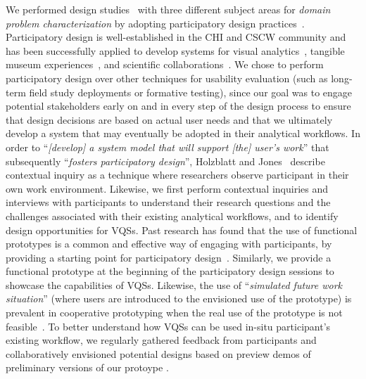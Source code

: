   \par We performed design studies~\cite{lam2012empirical,shneiderman2006strategies,Sedlmair2012} with three different subject areas for \textit{domain problem characterization} by adopting participatory design practices~\cite{Gould1983,Muller1993}. Participatory design is well-established in the CHI and CSCW community and has been successfully applied to develop systems for visual analytics~\cite{Aragon2008,Chuang2012}, tangible museum experiences~\cite{Ciolfi2016}, and scientific collaborations~\cite{Poon2008,Chen2016}. We chose to perform participatory design over other techniques for usability evaluation (such as long-term field study deployments or formative testing), since our goal was to engage potential stakeholders early on and in every step of the design process to ensure that design decisions are based on actual user needs and that we ultimately develop a system that may eventually be adopted in their analytical workflows. In order to ``\textit{[develop] a system model that will support [the] user's work}'' that subsequently ``\textit{fosters participatory design}'', Holzblatt and Jones~\cite{HoltzblattJones} describe contextual inquiry as a technique where researchers observe participant in their own work environment. Likewise, we first perform contextual inquiries and interviews with participants to understand their research questions and the challenges associated with their existing analytical workflows, and to identify design opportunities for VQSs. Past research has found that the use of functional prototypes is a common and effective way of engaging with participants, by providing a starting point for participatory design~\cite{Ciolfi2016}. Similarly, we provide a functional prototype at the beginning of the participatory design sessions to showcase the capabilities of VQSs. Likewise, the use of ``\textit{simulated future work situation}'' (where users are introduced to the envisioned use of the prototype) is prevalent in cooperative prototyping when the real use of the prototype is not feasible~\cite{Grnbak1991}. To better understand how VQSs can be used in-situ participant's existing workflow, we regularly gathered feedback from participants and collaboratively envisioned potential designs based on preview demos of preliminary versions of our protoype \zvpp. 
